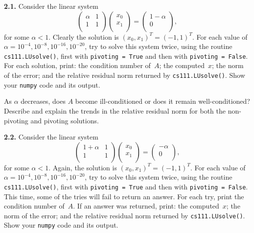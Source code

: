 \documentclass[11pt]{article}
\begin{document}
\par\medskip
{\bf 2.1.} 
Consider the linear system
$$
   \left(
   \begin{array}{cc}
      \alpha & 1 \\ 	
           1 & 1 \\ 	
   \end{array} \right)
   \left(
   \begin{array}{c}
      x_0 \\ 	
      x_1 \\ 	
   \end{array} \right)
   =
   \left(
   \begin{array}{cc}
      1 - \alpha \\ 	
               0 \\ 	
   \end{array} \right),
$$
for some $\alpha < 1$.
Clearly the solution is $(x_0, x_1)^T = (-1,1)^T$.
For each value of $\alpha = 10^{-4}, 10^{-8}, 10^{-16}, 10^{-20}$,
try to solve this system twice, using the routine {\tt cs111.LUsolve()},
first with {\tt pivoting = True} and then with {\tt pivoting = False}.
For each solution, print: 
the condition number of~$A$;
the computed~$x$; the norm of the error; 
and the relative residual norm returned by {\tt cs111.LUsolve()}.
Show your {\tt numpy} code and its output.

As $\alpha$ decreases, does $A$ become ill-conditioned or does it remain well-conditioned?
Describe and explain the trends in the relative residual norm
for both the non-pivoting and pivoting solutions.

\par\medskip
{\bf 2.2.} 
Consider the linear system
$$
   \left(
   \begin{array}{cc}
      1 + \alpha & 1 \\ 	
               1 & 1 \\ 	
   \end{array} \right)
   \left(
   \begin{array}{c}
      x_0 \\ 	
      x_1 \\ 	
   \end{array} \right)
   =
   \left(
   \begin{array}{cc}
      -\alpha \\ 	
            0 \\ 	
   \end{array} \right),
$$
for some $\alpha < 1$.
Again, the solution is $(x_0, x_1)^T = (-1,1)^T$.
For each value of $\alpha = 10^{-4}, 10^{-8}, 10^{-16}, 10^{-20}$,
try to solve this system twice, using the routine {\tt cs111.LUsolve()},
first with {\tt pivoting = True} and then with {\tt pivoting = False}.
This time, some of the tries will fail to return an answer.
For each try, print the condition number of~$A$.
If an answer was returned, print:
the computed~$x$; the norm of the error; 
and the relative residual norm returned by {\tt cs111.LUsolve()}.
Show your {\tt numpy} code and its output.
\end{document}
